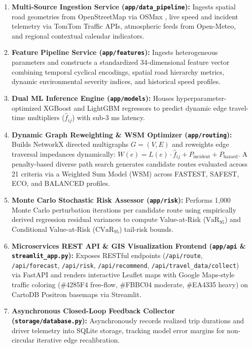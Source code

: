 \documentclass[journal]{IEEEtran}
\begin{document}
\begin{enumerate}
    \item \textbf{Multi-Source Ingestion Service (\texttt{app/data\_pipeline}):} Ingests spatial road geometries from OpenStreetMap via OSMnx \cite{ref10}, live speed and incident telemetry via TomTom Traffic APIs, atmospheric feeds from Open-Meteo, and regional contextual calendar indicators.
    \item \textbf{Feature Pipeline Service (\texttt{app/features}):} Ingests heterogeneous parameters and constructs a standardized 34-dimensional feature vector combining temporal cyclical encodings, spatial road hierarchy metrics, dynamic environmental severity indices, and historical speed profiles.
    \item \textbf{Dual ML Inference Engine (\texttt{app/models}):} Houses hyperparameter-optimized XGBoost and LightGBM regressors to predict dynamic edge travel-time multipliers ($\hat{f}_{ij}$) with sub-3 ms latency.
    \item \textbf{Dynamic Graph Reweighting \& WSM Optimizer (\texttt{app/routing}):} Builds NetworkX directed multigraphs $G=(V,E)$ and reweights edge traversal impedances dynamically: $W(e) = L(e) \cdot \hat{f}_{ij} + P_{\text{incident}} + P_{\text{hazard}}$. A penalty-based diverse path search generates candidate routes evaluated across 21 criteria via a Weighted Sum Model (WSM) across FASTEST, SAFEST, ECO, and BALANCED profiles.
    \item \textbf{Monte Carlo Stochastic Risk Assessor (\texttt{app/risk}):} Performs 1,000 Monte Carlo perturbation iterations per candidate route using empirically derived regression residual variances to compute Value-at-Risk ($\text{VaR}_{95}$) and Conditional Value-at-Risk ($\text{CVaR}_{95}$) tail-risk bounds.
    \item \textbf{Microservices REST API \& GIS Visualization Frontend (\texttt{app/api} \& \texttt{streamlit\_app.py}):} Exposes RESTful endpoints (\texttt{/api/route}, \texttt{/api/forecast}, \texttt{/api/risk}, \texttt{/api/recommend}, \texttt{/api/travel\_data/collect}) via FastAPI and renders interactive Leaflet maps with Google Maps-style traffic coloring (\#4285F4 free-flow, \#FBBC04 moderate, \#EA4335 heavy) on CartoDB Positron basemaps via Streamlit.
    \item \textbf{Asynchronous Closed-Loop Feedback Collector (\texttt{storage/database.py}):} Asynchronously records realized trip durations and driver telemetry into SQLite storage, tracking model error margins for non-circular iterative edge recalibration.
\end{enumerate}
\end{document}
